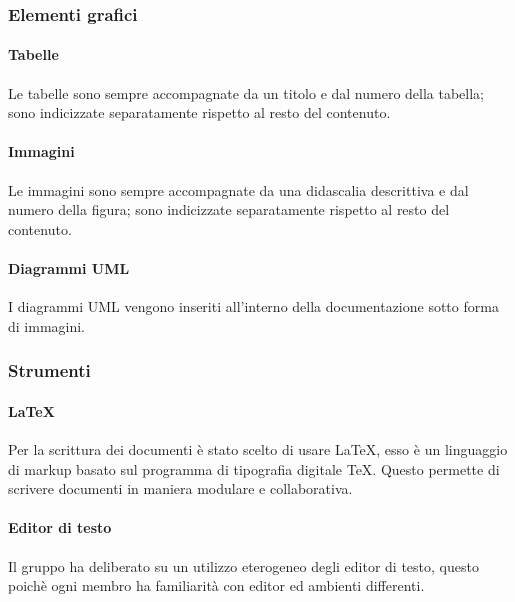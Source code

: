 		\subsubsection{Elementi grafici}
			\paragraph{Tabelle}
				Le tabelle sono sempre accompagnate da un titolo e dal numero della tabella; sono indicizzate separatamente rispetto al resto del contenuto.
			\paragraph{Immagini}
				Le immagini sono sempre accompagnate da una didascalia descrittiva e dal numero della figura; sono indicizzate separatamente rispetto al resto del contenuto.
			\paragraph{Diagrammi UML}
				I diagrammi UML vengono inseriti all'interno della documentazione sotto forma di immagini.
		\subsubsection{Strumenti}
			\paragraph{LaTeX}
				Per la scrittura dei documenti è stato scelto di usare \LaTeX{}, esso è un linguaggio di markup basato sul programma di tipografia digitale \TeX{}. Questo permette di scrivere documenti in maniera modulare e collaborativa.
			\paragraph{Editor di testo}
				Il gruppo ha deliberato su un utilizzo eterogeneo degli editor di testo, questo poichè ogni membro ha familiarità con editor ed ambienti differenti.
